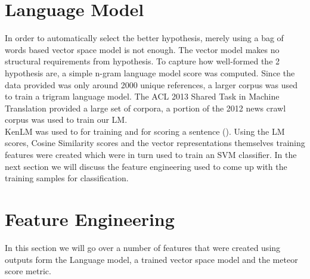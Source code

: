 \documentclass[11pt]{article}
\begin{document}
 \section{Language Model}
 In order to automatically select the better hypothesis, merely using a bag of
 words based vector space model is not enough. The vector model makes no
 structural requirements from hypothesis. To capture how well-formed the 2
 hypothesis are, a simple n-gram language model score was computed. Since the
 data provided was only around 2000 unique references, a larger corpus was used
 to train a trigram language model. The ACL 2013 Shared Task in Machine
 Translation provided a large set of corpora, a portion of the 2012 news crawl
 corpus was used to train our LM.\\
  KenLM was used to for training and for
 scoring a sentence (\cite{heafield2011kenlm}). Using the LM scores, Cosine Similarity
 scores and the vector representations themselves training features were created
 which were in turn used to train an SVM classifier. In the next section we will
 discuss the feature engineering used to come up with the training samples for
 classification.
 \section{Feature Engineering}
In this section we will go over a number of features that were created using
outputs form the Language model, a trained vector space model and the meteor
score metric.
\end{document}

